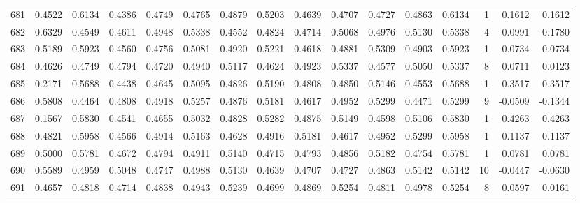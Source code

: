 \begin{tabular}{lrrrrrrrrrrrrrrr}
681 &      0.4522 &  0.6134 &  0.4386 &  0.4749 &  0.4765 &  0.4879 &  0.5203 &  0.4639 &  0.4707 &  0.4727 &   0.4863 &     0.6134 &      1 &                    0.1612 &                     0.1612 \\
682 &      0.6329 &  0.4549 &  0.4611 &  0.4948 &  0.5338 &  0.4552 &  0.4824 &  0.4714 &  0.5068 &  0.4976 &   0.5130 &     0.5338 &      4 &                   -0.0991 &                    -0.1780 \\
683 &      0.5189 &  0.5923 &  0.4560 &  0.4756 &  0.5081 &  0.4920 &  0.5221 &  0.4618 &  0.4881 &  0.5309 &   0.4903 &     0.5923 &      1 &                    0.0734 &                     0.0734 \\
684 &      0.4626 &  0.4749 &  0.4794 &  0.4720 &  0.4940 &  0.5117 &  0.4624 &  0.4923 &  0.5337 &  0.4577 &   0.5050 &     0.5337 &      8 &                    0.0711 &                     0.0123 \\
685 &      0.2171 &  0.5688 &  0.4438 &  0.4645 &  0.5095 &  0.4826 &  0.5190 &  0.4808 &  0.4850 &  0.5146 &   0.4553 &     0.5688 &      1 &                    0.3517 &                     0.3517 \\
686 &      0.5808 &  0.4464 &  0.4808 &  0.4918 &  0.5257 &  0.4876 &  0.5181 &  0.4617 &  0.4952 &  0.5299 &   0.4471 &     0.5299 &      9 &                   -0.0509 &                    -0.1344 \\
687 &      0.1567 &  0.5830 &  0.4541 &  0.4655 &  0.5032 &  0.4828 &  0.5282 &  0.4875 &  0.5149 &  0.4598 &   0.5106 &     0.5830 &      1 &                    0.4263 &                     0.4263 \\
688 &      0.4821 &  0.5958 &  0.4566 &  0.4914 &  0.5163 &  0.4628 &  0.4916 &  0.5181 &  0.4617 &  0.4952 &   0.5299 &     0.5958 &      1 &                    0.1137 &                     0.1137 \\
689 &      0.5000 &  0.5781 &  0.4672 &  0.4794 &  0.4911 &  0.5140 &  0.4715 &  0.4793 &  0.4856 &  0.5182 &   0.4754 &     0.5781 &      1 &                    0.0781 &                     0.0781 \\
690 &      0.5589 &  0.4959 &  0.5048 &  0.4747 &  0.4988 &  0.5130 &  0.4639 &  0.4707 &  0.4727 &  0.4863 &   0.5142 &     0.5142 &     10 &                   -0.0447 &                    -0.0630 \\
691 &      0.4657 &  0.4818 &  0.4714 &  0.4838 &  0.4943 &  0.5239 &  0.4699 &  0.4869 &  0.5254 &  0.4811 &   0.4978 &     0.5254 &      8 &                    0.0597 &                     0.0161 \\

\end{tabular}
